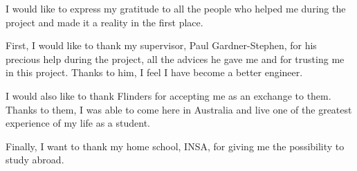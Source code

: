 \begin{acknowledgements}


I would like to express my gratitude to all the people who helped me during the project and made it a reality in the first place.

First, I would like to thank my supervisor, Paul Gardner-Stephen, for his precious help during the project, all the advices he gave me and for trusting me in this project. Thanks to him, I feel I have become a better engineer.

I would also like to thank Flinders for accepting me as an exchange to them. Thanks to them, I was able to come here in Australia and live one of the greatest experience of my life as a student.

Finally, I want to thank my home school, INSA, for giving me the possibility to study abroad.




\end{acknowledgements}
